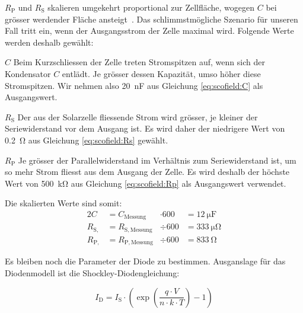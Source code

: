 $R_{\mathrm{P}}$   und  $R_{\mathrm{S}}$   skalieren  umgekehrt   proportional
zur   Zellfl\"ache,    wogegen   $C$   bei   gr\"osser    werdender   Fl\"ache
ansteigt~\cite{ref:solar:scofield}. Das  schlimmstm\"ogliche   Szenario  f\"ur
unseren   Fall  tritt   ein,  wenn   der  Ausgangsstrom   der  Zelle   maximal
wird. Folgende Werte werden deshalb gew\"ahlt:

\begin{symbols}
    \firmlist
    \item[$C$]
        Beim Kurzschliessen der  Zelle treten Stromspitzen auf,  wenn sich der
        Kondensator  $C$  entl\"adt. Je  gr\"osser  dessen  Kapazit\"at,  umso
        h\"oher diese Stromspitzen.  Wir  nehmen also \SI{20}{\nano\farad} aus
        Gleichung \ref{eq:scofield:C} als Ausgangswert.
    \item[$R_{\mathrm{S}}$]
        Der aus der Solarzelle fliessende Strom wird gr\"osser, je kleiner der
        Seriewiderstand vor dem Ausgang ist. Es wird daher der niedrigere Wert
        von \SI{0.2}{\ohm} aus Gleichung \ref{eq:scofield:Rs} gew\"ahlt.
    \item[$R_{\mathrm{P}}$]
        Je    gr\"osser   der    Parallelwiderstand   im    Verh\"altnis   zum
        Seriewiderstand  ist, um  so mehr  Strom fliesst  aus dem  Ausgang der
        Zelle.  Es wird deshalb der h\"ochste Wert von \SI{500}{\kilo\ohm} aus
        Gleichung \ref{eq:scofield:Rp} als Ausgangswert verwendet.
\end{symbols}

Die skalierten Werte sind somit:
\begin{alignat}{2}
    C               &= C_{\mathrm{Messung}}    &\cdot 600 &= \SI{12}{\micro\farad} \\
    R_{\mathrm{S,}} &= R_{\mathrm{S, Messung}} &\div  600 &= \SI{333}{\micro\ohm}    \\
    R_{\mathrm{P,}} &= R_{\mathrm{P, Messung}} &\div  600 &= \SI{833}{\ohm}
\end{alignat}



Es bleiben noch die Parameter der Diode zu bestimmen. Ausganslage f\"ur das
Diodenmodell ist die Shockley-Diodengleichung:

\begin{equation}
    \label{eq:diode}
    I_{\mathrm{D}} = I_{\mathrm{S}} \cdot \left( \exp\left(\frac{q \cdot V}{n \cdot k \cdot T}\right) - 1 \right)
\end{equation}

